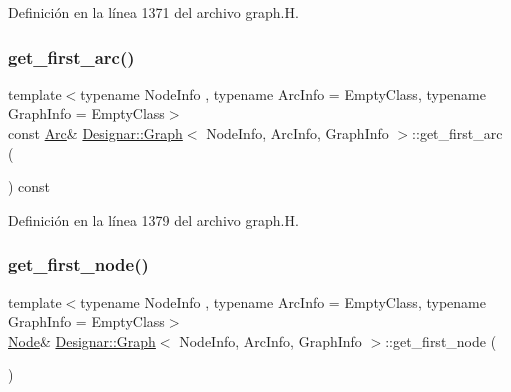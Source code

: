 Definición en la línea 1371 del archivo graph.\+H.

\mbox{\label{class_designar_1_1_graph_a3a4be7fef798a957b0a66102f1d30c39}} 
\subsubsection{\texorpdfstring{get\+\_\+first\+\_\+arc()}{get\_first\_arc()}\hspace{0.1cm}{\footnotesize\ttfamily [2/2]}}
{\footnotesize\ttfamily template$<$typename Node\+Info , typename Arc\+Info  = Empty\+Class, typename Graph\+Info  = Empty\+Class$>$ \\
const \hyperlink{class_designar_1_1_graph_a74c730ef4ce2d20f998d72bd25c2b5bf}{Arc}\& \hyperlink{class_designar_1_1_graph}{Designar\+::\+Graph}$<$ Node\+Info, Arc\+Info, Graph\+Info $>$\+::get\+\_\+first\+\_\+arc (\begin{DoxyParamCaption}{ }\end{DoxyParamCaption}) const\hspace{0.3cm}{\ttfamily [inline]}}



Definición en la línea 1379 del archivo graph.\+H.

\mbox{\label{class_designar_1_1_graph_ab9f34a6b6160f9e66a3103c78b13d7d6}} 
\subsubsection{\texorpdfstring{get\+\_\+first\+\_\+node()}{get\_first\_node()}\hspace{0.1cm}{\footnotesize\ttfamily [1/2]}}
{\footnotesize\ttfamily template$<$typename Node\+Info , typename Arc\+Info  = Empty\+Class, typename Graph\+Info  = Empty\+Class$>$ \\
\hyperlink{class_designar_1_1_graph_a5dfc7dba9d092ac489c72e40390c37d0}{Node}\& \hyperlink{class_designar_1_1_graph}{Designar\+::\+Graph}$<$ Node\+Info, Arc\+Info, Graph\+Info $>$\+::get\+\_\+first\+\_\+node (\begin{DoxyParamCaption}{ }\end{DoxyParamCaption})\hspace{0.3cm}{\ttfamily [inline]}}



